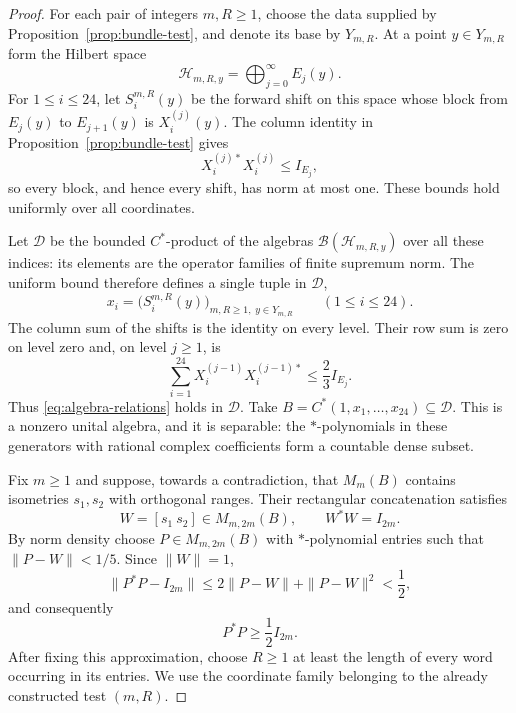 \begin{proof}
For each pair of integers $m,R\ge1$, choose the data supplied by
Proposition~\ref{prop:bundle-test}, and denote its base by $Y_{m,R}$.
At a point $y\in Y_{m,R}$ form the Hilbert space
\[
  \mathcal H_{m,R,y}=\bigoplus_{j=0}^{\infty}E_j(y).
\]
For $1\leq i\leq24$, let $S_i^{m,R}(y)$ be the forward shift on this
space whose block from $E_j(y)$ to $E_{j+1}(y)$ is $X_i^{(j)}(y)$.
The column identity in
Proposition~\ref{prop:bundle-test} gives
\[
  X_i^{(j)*}X_i^{(j)}\le I_{E_j},
\]
so every block, and hence every shift, has norm at most one.  These
bounds hold uniformly over all coordinates.

Let $\mathcal D$ be the bounded $C^*$-product of the algebras
$\mathcal B(\mathcal H_{m,R,y})$ over all these indices: its elements are
the operator families of finite supremum norm.  The uniform bound
therefore defines a single tuple in $\mathcal D$,
\[
  x_i=\bigl(S_i^{m,R}(y)\bigr)_{m,R\geq1,\;y\in Y_{m,R}}
  \qquad(1\leq i\leq24).
\]
The column sum of the shifts is the identity on every level.  Their
row sum is zero on level zero and, on level $j\ge1$, is
\[
  \sum_{i=1}^{24}X_i^{(j-1)}X_i^{(j-1)*}
  \le\frac23 I_{E_j}.
\]
Thus \eqref{eq:algebra-relations} holds in $\mathcal D$.  Take
$B=C^*(1,x_1,\ldots,x_{24})\subseteq\mathcal D$.  This is a nonzero
unital algebra, and it is separable: the $*$-polynomials in these
generators with rational complex coefficients form a countable dense
subset.

Fix $m\ge1$ and suppose, towards a contradiction, that $M_m(B)$
contains isometries $s_1,s_2$ with orthogonal ranges.  Their rectangular
concatenation satisfies
\[
  W=[s_1\ s_2]\in M_{m,2m}(B),
  \qquad W^*W=I_{2m}.
\]
By norm density choose $P\in M_{m,2m}(B)$ with $*$-polynomial entries
such that $\|P-W\|<1/5$.  Since $\|W\|=1$,
\[
  \|P^*P-I_{2m}\|
  \le 2\|P-W\|+\|P-W\|^2<\frac12,
\]
and consequently
\begin{equation}
  P^*P\ge\frac12 I_{2m}.
  \label{eq:polynomial-lower-bound}
\end{equation}
After fixing this approximation, choose $R\ge1$ at least the length of
every word occurring in its entries.  We use the coordinate family
belonging to the already constructed test $(m,R)$.


\end{proof}
